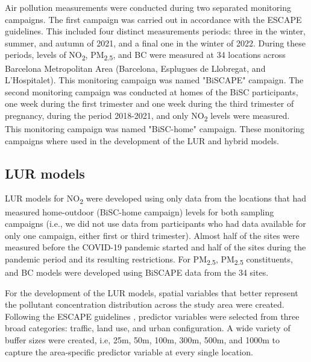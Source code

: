 \documentclass{article}
\begin{document}
Air pollution measurements were conducted during two separated monitoring campaigns. The first campaign was carried out in accordance with the ESCAPE guidelines. This included four distinct measurements periods: three in the winter, summer, and autumn of 2021, and a final one in the winter of 2022. During these periods, levels of NO\textsubscript{2}, PM\textsubscript{2.5}, and BC were measured at 34 locations across Barcelona Metropolitan Area (Barcelona, Esplugues de Llobregat, and L'Hospitalet). This monitoring campaign was named "BiSCAPE" campaign. The second monitoring campaign was conducted at homes of the BiSC participants, one week during the first trimester and one week during the third trimester of pregnancy, during the period 2018-2021, and only NO\textsubscript{2} levels were measured. This monitoring campaign was named "BiSC-home" campaign. These monitoring campaigns where used in the development of the LUR and hybrid models. 

\subsection{LUR models}

LUR models for NO\textsubscript{2}  were developed using only data from the locations that had measured home-outdoor (BiSC-home campaign) levels for both sampling campaigns (i.e., we did not use data from participants who had data available for only one campaign, either first or third trimester). Almost half of the sites were measured before the COVID-19 pandemic started and half of the sites during the pandemic period and its resulting restrictions. For PM\textsubscript{2.5}, PM\textsubscript{2.5} constituents, and BC models were developed using BiSCAPE data from the 34 sites.

For the development of the LUR models, spatial variables that better represent the pollutant concentration distribution across the study area were created. Following the ESCAPE guidelines \cite{eeftens2012, beelen2013},  predictor variables were selected from three broad categories: traffic, land use, and urban configuration. A wide variety of buffer sizes were created, i.e, 25m, 50m, 100m, 300m, 500m, and 1000m to capture the area-specific predictor variable at every single location.
\end{document}
